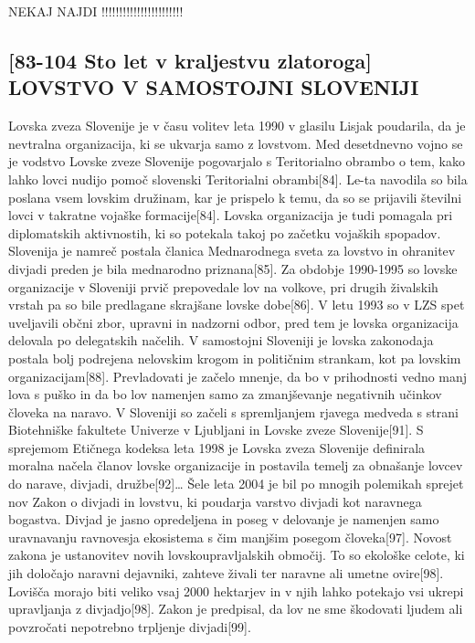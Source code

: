 \documentclass[a4paper,12pt,openright]{book}
\begin{document}
NEKAJ NAJDI !!!!!!!!!!!!!!!!!!!!!!!

\subsection{[83-104 Sto let v kraljestvu zlatoroga] LOVSTVO V SAMOSTOJNI SLOVENIJI}
Lovska zveza Slovenije je v času volitev leta 1990 v glasilu Lisjak poudarila, da je nevtralna organizacija, ki se ukvarja samo z lovstvom. 
Med desetdnevno vojno se je vodstvo Lovske zveze Slovenije pogovarjalo s Teritorialno obrambo o tem, kako lahko lovci nudijo pomoč slovenski Teritorialni obrambi[84].
Le-ta navodila so bila poslana vsem lovskim družinam, kar je prispelo k temu, da so se prijavili številni lovci v takratne vojaške formacije[84].
Lovska organizacija je tudi pomagala pri diplomatskih aktivnostih, ki so potekala takoj po začetku vojaških spopadov.
Slovenija je namreč postala članica Mednarodnega sveta za lovstvo in ohranitev divjadi preden je bila mednarodno priznana[85].
Za obdobje 1990-1995 so lovske organizacije v Sloveniji prvič prepovedale lov na volkove, pri drugih živalskih vrstah pa so bile predlagane skrajšane lovske dobe[86]. 
V letu 1993 so v LZS spet uveljavili občni zbor, upravni in nadzorni odbor, pred tem je lovska organizacija delovala po delegatskih načelih.
V samostojni Sloveniji je lovska zakonodaja postala bolj podrejena nelovskim krogom in političnim strankam, kot pa lovskim organizacijam[88]. 
Prevladovati je začelo mnenje, da bo v prihodnosti vedno manj lova s puško in da bo lov namenjen samo za zmanjševanje negativnih učinkov človeka na naravo.
V Sloveniji so začeli s spremljanjem rjavega medveda s strani Biotehniške fakultete Univerze v Ljubljani in Lovske zveze Slovenije[91]. 
S sprejemom Etičnega kodeksa leta 1998 je Lovska zveza Slovenije definirala moralna načela članov lovske organizacije in postavila temelj za obnašanje lovcev do narave, divjadi, družbe[92]… 
Šele leta 2004 je bil po mnogih polemikah sprejet nov Zakon o divjadi in lovstvu, ki poudarja varstvo divjadi kot naravnega bogastva. 
Divjad je jasno opredeljena in poseg v delovanje je namenjen samo uravnavanju ravnovesja ekosistema s čim manjšim posegom človeka[97].
Novost zakona je ustanovitev novih  lovskoupravljalskih območij. 
To so ekološke celote, ki jih določajo naravni dejavniki, zahteve živali ter naravne ali umetne ovire[98].
Lovišča morajo biti veliko vsaj 2000 hektarjev in v njih lahko potekajo vsi ukrepi upravljanja z divjadjo[98].
Zakon je predpisal, da lov ne sme škodovati ljudem ali povzročati nepotrebno trpljenje divjadi[99]. \cite{Sto_83_104}
\end{document}
